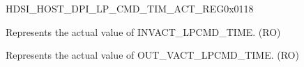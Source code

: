 \begin{register}{H}{DSI\_HOST\_DPI\_LP\_CMD\_TIM\_ACT\_REG}{0x0118}\label{regdesc:DSIHOSTDPILPCMDTIMACTREG}
%
%
%
%
\regnewline%
\begin{regdesc}\begin{reglist}
\label{fielddesc:DSIHOSTINVACTLPCMDTIMEACT}\item [DSI\_HOST\_INVACT\_LPCMD\_TIME\_ACT] Represents the actual value of INVACT\_LPCMD\_TIME. (RO)
\label{fielddesc:DSIHOSTOUTVACTLPCMDTIMEACT}\item [DSI\_HOST\_OUTVACT\_LPCMD\_TIME\_ACT] Represents the actual value of OUT\_VACT\_LPCMD\_TIME. (RO)
\end{reglist}\end{regdesc}
\end{register}


